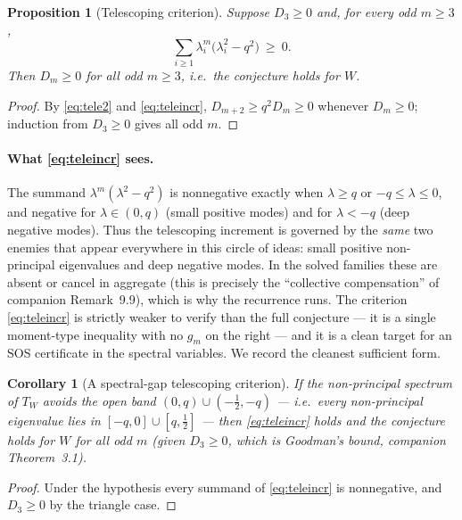 \documentclass[11pt]{article}
\newtheorem{proposition}[theorem]{Proposition}
\newtheorem{corollary}[theorem]{Corollary}
\theoremstyle{definition}
\newcommand{\1}{\mathbf{1}}
\begin{document}
\begin{proposition}[Telescoping criterion]\label{prop:tele}
Suppose $D_3\ge0$ and, for every odd $m\ge3$,
\begin{equation}\label{eq:teleincr}
\sum_{i\ge1}\lambda_i^m\bigl(\lambda_i^2-q^2\bigr)\ \ge\ 0 .
\end{equation}
Then $D_m\ge0$ for all odd $m\ge3$, i.e.\ the conjecture holds for $W$.
\end{proposition}

\begin{proof}
By \eqref{eq:tele2} and \eqref{eq:teleincr}, $D_{m+2}\ge q^2D_m\ge0$ whenever
$D_m\ge0$; induction from $D_3\ge0$ gives all odd $m$.
\end{proof}

\paragraph{What \eqref{eq:teleincr} sees.}
The summand $\lambda^m(\lambda^2-q^2)$ is nonnegative exactly when $\lambda\ge q$
or $-q\le\lambda\le0$, and negative for $\lambda\in(0,q)$ (small positive modes)
and for $\lambda<-q$ (deep negative modes). Thus the telescoping increment is
governed by the \emph{same} two enemies that appear everywhere in this circle of
ideas: small positive non-principal eigenvalues and deep negative modes. In the
solved families these are absent or cancel in aggregate (this is precisely the
``collective compensation'' of companion Remark~9.9), which is why the recurrence
runs. The criterion \eqref{eq:teleincr} is strictly weaker to verify than the
full conjecture --- it is a single moment-type inequality with no $g_m$ on the
right --- and it is a clean target for an SOS certificate in the spectral
variables. We record the cleanest sufficient form.

\begin{corollary}[A spectral-gap telescoping criterion]\label{cor:telegap}
If the non-principal spectrum of $T_W$ avoids the open band
$(0,q)\cup(-\tfrac12,-q)$ --- i.e.\ every non-principal eigenvalue lies in
$[-q,0]\cup[q,\tfrac12]$ --- then \eqref{eq:teleincr} holds and the conjecture
holds for $W$ for all odd $m$ (given $D_3\ge0$, which is Goodman's bound,
companion Theorem~3.1).
\end{corollary}

\begin{proof}
Under the hypothesis every summand of \eqref{eq:teleincr} is nonnegative, and
$D_3\ge0$ by the triangle case.
\end{proof}
\end{document}
